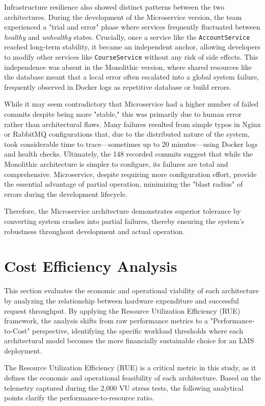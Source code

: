 Infrastructure resilience also showed distinct patterns between the two architectures. During the development of the Microservice version, the team experienced a "trial and error" phase where services frequently fluctuated between \textit{healthy} and \textit{unhealthy} states. Crucially, once a service like the \texttt{AccountService} reached long-term stability, it became an independent anchor, allowing developers to modify other services like \texttt{CourseService} without any risk of side effects. This independence was absent in the Monolithic version, where shared resources like the database meant that a local error often escalated into a global system failure, frequently observed in Docker logs as repetitive database or build errors.

While it may seem contradictory that Microservice had a higher number of failed commits despite being more "stable," this was primarily due to human error rather than architectural flaws. Many failures resulted from simple typos in Nginx or RabbitMQ configurations that, due to the distributed nature of the system, took considerable time to trace—sometimes up to 20 minutes—using Docker logs and health checks. Ultimately, the 148 recorded commits suggest that while the Monolithic architecture is simpler to configure, its failures are total and comprehensive. Microservice, despite requiring more configuration effort, provide the essential advantage of partial operation, minimizing the "blast radius" of errors during the development lifecycle.

Therefore, the Microservice architecture demonstrates superior tolerance by converting system crashes into partial failures, 
thereby ensuring the system's robustness throughout development and actual operation.

\section{Cost Efficiency Analysis}

This section evaluates the economic and operational viability of each architecture by analyzing the relationship between hardware expenditure and successful request throughput. By applying the Resource Utilization Efficiency (RUE) framework, the analysis shifts from raw performance metrics to a "Performance-to-Cost" perspective, identifying the specific workload thresholds where each architectural model becomes the more financially sustainable choice for an LMS deployment.

The Resource Utilization Efficiency (RUE) is a critical metric in this study, as it defines the economic and operational feasibility of each architecture. Based on the telemetry captured during the 2,000 VU stress tests, the following analytical points clarify the performance-to-resource ratio.


